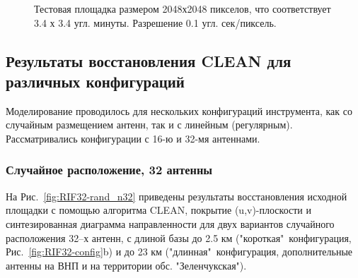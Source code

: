 \documentclass[10pt,a4paper]{article}
\begin{document}
\begin{figure}
\caption{Тестовая площадка размером 2048х2048 пикселов, что соответствует 3.4 х 3.4 угл. минуты. Разрешение 0.1 угл. сек/пиксель.}
\label{fig:HUDF2014}
\end{figure}

\subsection{Результаты восстановления CLEAN для различных конфигураций}

Моделирование проводилось для нескольких конфигураций инструмента, как со случайным размещением антенн, так и с линейным (регулярным). Рассматривались конфигурации с 16-ю и 32-мя антеннами. 

\subsubsection{Случайное расположение, 32 антенны}

На Рис.~\ref{fig:RIF32-rand_n32} приведены результаты восстановления исходной площадки с помощью алгоритма CLEAN, покрытие (u,v)-плоскости и синтезированная диаграмма направленности для двух вариантов случайного расположения 32--х антенн, с длиной базы до 2.5 км ("короткая"\ конфигурация, Рис.~\ref{fig:RIF32-config}b) и до 23 км ("длинная"\ конфигурация, дополнительные антенны на ВНП и на территории обс. "Зеленчукская").
\end{document}
